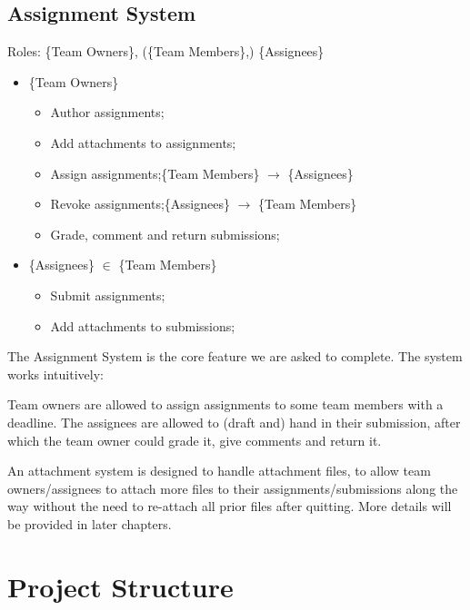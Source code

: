\documentclass[12pt]{report}
\newcommand{\n}{\par}
\newcommand{\br}{\vspace{1 em}\n}
\begin{document}
\subsection{Assignment System} \label{overview.project-objectives.assignment-system}
Roles: \{Team Owners\}, (\{Team Members\},) \{Assignees\}\n
\begin{itemize}
	\item \{Team Owners\}
	      \begin{itemize}
		      \item Author assignments;
		      \item Add attachments to assignments;
		      \item Assign assignments;\null\hfill \{Team Members\} $\rightarrow$ \{Assignees\}
		      \item Revoke assignments;\null\hfill \{Assignees\} $\rightarrow$ \{Team Members\}
		      \item Grade, comment and return submissions;
	      \end{itemize}
	\item \{Assignees\} $\in$ \{Team Members\}
	      \begin{itemize}
		      \item Submit assignments;
		      \item Add attachments to submissions;
	      \end{itemize}
\end{itemize}\n
The Assignment System is the core feature we are asked to complete.
The system works intuitively:\n
Team owners are allowed to assign assignments to some team members with a deadline.
The assignees are allowed to (draft and) hand in their submission,
after which the team owner could grade it, give comments and return it.
\br
An attachment system is designed to handle attachment files, to allow team owners/assignees
to attach more files to their assignments/submissions along the way
without the need to re-attach all prior files after quitting.
More details will be provided in later chapters.
\section{Project Structure} \label{overview.project-structure}
\end{document}
